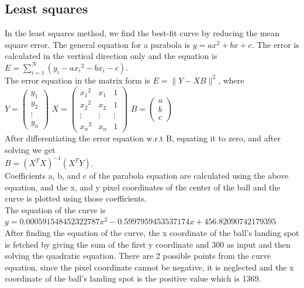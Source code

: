 \subsection{Least squares}
  In the least squares method, we find the best-fit curve by reducing the mean square error. The general equation for a parabola is $y = ax^2 + bx + c$. 
  The error is calculated in the vertical direction only and the equation is $E = \sum_{i=1}^{N} (y_i - ax{_i}{^2} - bx_i - c)$.\\
The error equation in the matrix form is $E = \| Y - XB \|^{2}$, where  \vspace{8mm} \\
  $Y =
  \begin{pmatrix}
    y_1 \\
    y_2 \\
     \vdots \\
    y_n
  \end{pmatrix}$ 
$ X =
  \begin{pmatrix}
    x{_1}{^2} & x{_1} & 1 \\
    x{_2}{^2} & x{_2} & 1 \\
     \vdots & \vdots & \vdots\\ 
    x{_n}{^2} & x{_n} & 1
  \end{pmatrix}$ 
$ B =
  \begin{pmatrix}
    a \\
    b \\
    c
  \end{pmatrix}$   \vspace{8mm} \\
After differentiating the error equation w.r.t B, equating it to zero, and after solving we get \\
$B = (X^T X)^{-1} (X^T Y)$. \\
Coefficients a, b, and c of the parabola equation are calculated using the above equation, and the x, and y pixel coordinates of the center of the ball and the curve is plotted using those coefficients.\\
The equation of the curve is $y =  0.000591548452322787 x^2  - 0.5997959453537174 x + 456.82090742179395$ \\
After finding the equation of the curve, the x coordinate of the ball's landing spot is fetched by giving the sum of the first y coordinate and 300 as input and then solving the quadratic equation. There are 2 possible points from the curve equation, since the pixel coordinate cannot be negative, it is neglected and the x coordinate of the ball's landing spot is the positive value which is 1369.
